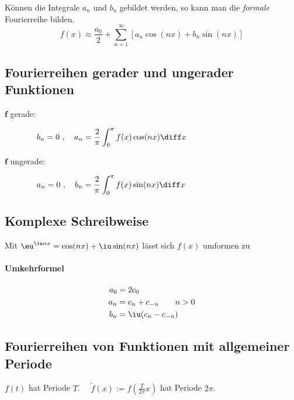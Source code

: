 		Können die Integrale $a_n$ und $b_n$ gebildet werden, so kann man die \emph{formale} Fourierreihe bilden.
		\[
			f(x) \approx \frac{a_0}{2} + \sum_{n=1}^\infty \left[a_n \cos(nx) + b_n \sin(nx)\right]
		\]
	\subsection{Fourierreihen gerader und ungerader Funktionen} %
		\begin{description}
			\item[\phantom{un}$\boldsymbol f$ gerade:] $\displaystyle\quad
				b_n = 0\ ,\quad a_n = \frac{2}{\pi}\int_0^\pi f(x) \cos(nx) \diff x
			$
			\item[$\boldsymbol f$ ungerade:] $\displaystyle\quad
				a_n = 0\ ,\quad b_n = \frac{2}{\pi}\int_0^\pi f(x) \sin(nx) \diff x
			$
		\end{description}
	\subsection{Komplexe Schreibweise} %
		Mit $
			\eu^{\iu nx} = \cos(nx) + \iu \sin(nx)
		$
		lässt sich $f(x)$ umformen zu
		
		\paragraph{Umkehrformel} %
			\begin{align*}
				a_0 &= 2 c_0 \\
				a_n &= c_n + c_{-n} \qquad n>0\\
				b_n &= \iu (c_n - c_{-n})
			\end{align*}
	\subsection{Fourierreihen von Funktionen mit allgemeiner Periode} %
		$f(t)$ hat Periode $T$.
		$\quad \widetilde f(x) := f(\frac{T}{2\pi}x)$ hat Periode $2\pi$.
		
